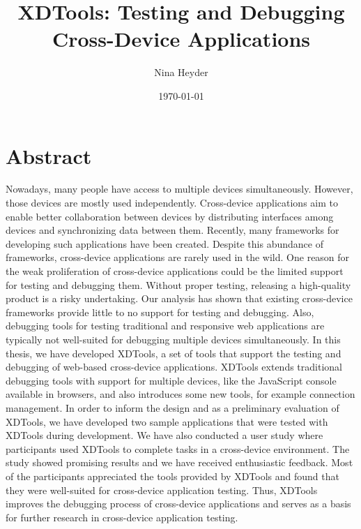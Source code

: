 \documentclass[11pt,a4paper]{globis-book}
\title{XDTools: Testing and Debugging Cross-Device Applications}
\author{Nina Heyder}
\institute{Institute of Information Systems}
\date{\today}
\begin{document}
\frontmatter
\maketitlepage
\cleardoublepage
{}

\chapter*{Abstract}

Nowadays, many people have access to multiple devices simultaneously. However, those devices are mostly used independently. Cross-device applications aim to enable better collaboration between devices by distributing interfaces among devices and synchronizing data between them. Recently, many frameworks for developing such applications have been created. Despite this abundance of frameworks, cross-device applications are rarely used in the wild. One reason for the weak proliferation of cross-device applications could be the limited support for testing and debugging them. Without proper testing, releasing a high-quality product is a risky undertaking. Our analysis has shown that existing cross-device frameworks provide little to no support for testing and debugging. Also, debugging tools for testing traditional and responsive web applications are typically not well-suited for debugging multiple devices simultaneously. In this thesis, we have developed XDTools, a set of tools that support the testing and debugging of web-based cross-device applications. XDTools extends traditional debugging tools with support for multiple devices, like the JavaScript console available in browsers, and also introduces some new tools, for example connection management. In order to inform the design and as a preliminary evaluation of XDTools, we have developed two sample applications that were tested with XDTools during development. We have also conducted a user study where participants used XDTools to complete tasks in a cross-device environment. The study showed promising results and we have received enthusiastic feedback. Most of the participants appreciated the tools provided by XDTools and found that they were well-suited for cross-device application testing. Thus, XDTools improves the debugging process of cross-device applications and serves as a basis for further research in cross-device application testing.

\tableofcontents

\mainmatter









\end{document}
